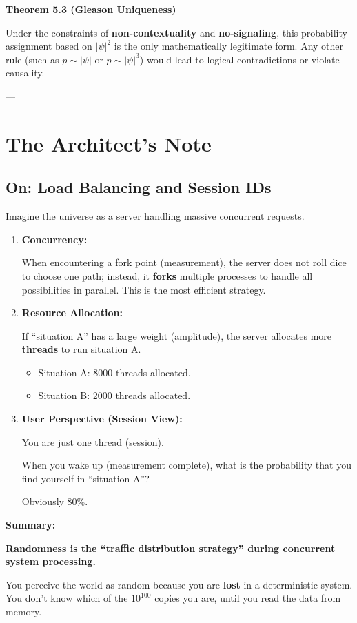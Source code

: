 \textbf{Theorem 5.3 (Gleason Uniqueness)}

Under the constraints of \textbf{non-contextuality} and \textbf{no-signaling}, this probability assignment based on \textbf{$|\psi|^2$} is the only mathematically legitimate form. Any other rule (such as \textbf{$p \sim |\psi|$} or \textbf{$p \sim |\psi|^3$}) would lead to logical contradictions or violate causality.

---

\section{The Architect's Note}

\subsection{On: Load Balancing and Session IDs}

Imagine the universe as a server handling massive concurrent requests.

\begin{enumerate}
\item \textbf{Concurrency:}

    When encountering a fork point (measurement), the server does not roll dice to choose one path; instead, it \textbf{forks} multiple processes to handle all possibilities in parallel. This is the most efficient strategy.

\item \textbf{Resource Allocation:}

    If ``situation A'' has a large weight (amplitude), the server allocates more \textbf{threads} to run situation A.

    \begin{itemize}
    \item Situation A: 8000 threads allocated.

    \item Situation B: 2000 threads allocated.
    \end{itemize}

\item \textbf{User Perspective (Session View):}

    You are just one thread (session).

    When you wake up (measurement complete), what is the probability that you find yourself in ``situation A''?

    Obviously 80\%.
\end{enumerate}

\textbf{Summary:}

\textbf{Randomness is the ``traffic distribution strategy'' during concurrent system processing.}

You perceive the world as random because you are \textbf{lost} in a deterministic system. You don't know which of the \textbf{$10^{100}$} copies you are, until you read the data from memory.

